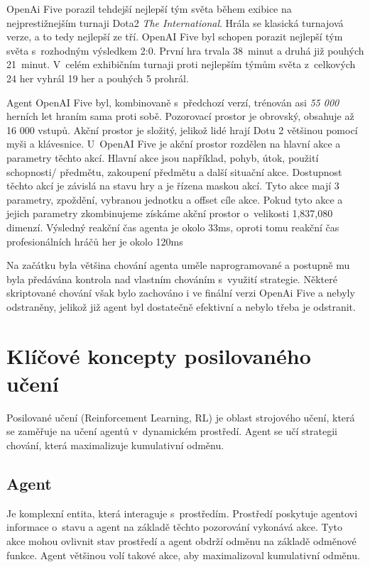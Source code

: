 OpenAi Five porazil tehdejší nejlepší tým světa během exibice na nejprestižnejším turnaji Dota2 \textit{The International}.
Hrála se klasická turnajová verze, a to tedy nejlepší ze tří.
OpenAI Five byl schopen porazit nejlepší tým světa s~rozhodným výsledkem 2:0.
První hra trvala 38~minut a druhá již pouhých 21~minut.
V~celém exhibičním turnaji proti nejlepším týmům světa z~celkových 24 her vyhrál 19 her a pouhých 5 prohrál.

Agent OpenAI Five byl, kombinovaně s~předchozí verzí, trénován asi \emph{55 000} herních let hraním sama proti sobě.
Pozorovací prostor je obrovský, obsahuje až 16 000 vstupů.
Akční prostor je složitý, jelikož lidé hrají Dotu 2 většinou pomocí myši a klávesnice.
U~OpenAI Five je akční prostor rozdělen na hlavní akce a parametry těchto akcí.
Hlavní akce jsou například, pohyb, útok, použití schopnosti/ předmětu, zakoupení předmětu a další situační akce.
Dostupnost těchto akcí je závislá na stavu hry a je řízena maskou akcí.
Tyto akce mají 3 parametry, zpoždění, vybranou jednotku a offset cíle akce.
Pokud tyto akce a jejich parametry zkombinujeme získáme akční prostor o~velikosti 1,837,080 dimenzí.
Výsledný reakční čas agenta je okolo 33ms, oproti tomu reakční čas profesionálních hráčů her je okolo 120ms~\cite{reaction_time}

Na začátku byla většina chování agenta uměle naprogramované a postupně mu byla předávána kontrola nad vlastním chováním s~využití strategie.
Některé skriptované chování však bylo zachováno i ve finální verzi OpenAi Five a nebyly odstraněny, jelikož již agent byl dostatečně efektivní a nebylo třeba je odstranit.

\section{Klíčové koncepty posilovaného učení}\label{sec:klicove-koncepty-posilovaneho-uceni}
Posilované učení (Reinforcement Learning, RL) je oblast strojového učení, která se zaměřuje na učení agentů v~dynamickém prostředí.
Agent se učí strategii chování, která maximalizuje kumulativní odměnu.

\subsection{Agent}\label{subsec:agent}

Je komplexní entita, která interaguje s~prostředím.
Prostředí poskytuje agentovi informace o~stavu a agent na základě těchto pozorování vykonává akce.
Tyto akce mohou ovlivnit stav prostředí a agent obdrží odměnu na základě odměnové funkce.
Agent většinou volí takové akce, aby maximalizoval kumulativní odměnu.

